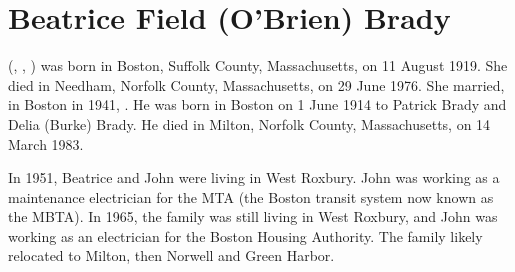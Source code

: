 \section{Beatrice Field (O'Brien) Brady}\label{per:Beatrice4OBrien}

 (, , ) was born in Boston, Suffolk County, Massachusetts, on 11 August 1919.\cite{Beatrice4OBrienBirth} She died in Needham, Norfolk County, Massachusetts, on 29 June 1976.\cite{Beatrice4OBrienDeath} She married, in Boston in 1941, .\cite{Beatrice4OBrienMarriage} He was born in Boston on 1 June 1914 to Patrick Brady and Delia (Burke) Brady.\cite{JohnBradyDraft} He died in Milton, Norfolk County, Massachusetts, on 14 March 1983.\cite{JohnBradyDeath}

In 1951, Beatrice and John were living in West Roxbury. John was working as a maintenance electrician for the MTA (the Boston transit system now known as the MBTA).\cite{JohnBrady1951} In 1965, the family was still living in West Roxbury, and John was working as an electrician for the Boston Housing Authority.\cite{JohnBrady1965} The family likely relocated to Milton, then Norwell and Green Harbor.\cite{Beatrice4OBrienObit}

%
%	
%	
%	

